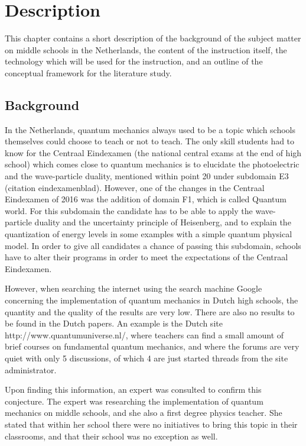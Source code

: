 \documentclass[12pt]{report} %
\begin{document}
\chapter{Description}

This chapter contains a short description of the background of the subject matter on middle schools in the Netherlands, the content of the instruction itself, the technology which will be used for the instruction, and an outline of the conceptual framework for the literature study.

\section{Background}

In the Netherlands, quantum mechanics always used to be a topic which schools themselves could choose to teach or not to teach. The only skill students had to know for the Centraal Eindexamen (the national central exams at the end of high school) which comes close to quantum mechanics is to elucidate the photoelectric and the wave-particle duality, mentioned within point 20 under subdomain E3 (citation eindexamenblad). However, one of the changes in the Centraal Eindexamen of 2016 was the addition of domain F1, which is called Quantum world. For this subdomain the candidate has to be able to apply the wave-particle duality and the uncertainty principle of Heisenberg, and to explain the quantization of energy levels in some examples with a simple quantum physical model. In order to give all candidates a chance of passing this subdomain, schools have to alter their programs in order to meet the expectations of the Centraal Eindexamen.

However, when searching the internet using the search machine Google concerning the implementation of quantum mechanics in Dutch high schools, the quantity and the quality of the results are very low. There are also no results to be found in the Dutch papers. An example is the Dutch site http://www.quantumuniverse.nl/, where teachers can find a small amount of brief courses on fundamental quantum mechanics, and where the forums are very quiet with only 5 discussions, of which 4 are just started threads from the site administrator.

Upon finding this information, an expert was consulted to confirm this conjecture. The expert was researching the implementation of quantum mechanics on middle schools, and she also a first degree physics teacher. She stated that within her school there were no initiatives to bring this topic in their classrooms, and that their school was no exception as well.
\end{document}
